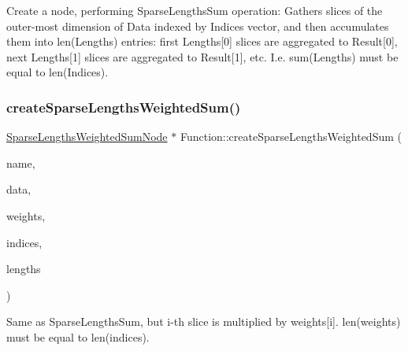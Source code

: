 Create a node, performing Sparse\+Lengths\+Sum operation\+: Gathers slices of the outer-\/most dimension of Data indexed by Indices vector, and then accumulates them into len(\+Lengths) entries\+: first Lengths\mbox{[}0\mbox{]} slices are aggregated to Result\mbox{[}0\mbox{]}, next Lengths\mbox{[}1\mbox{]} slices are aggregated to Result\mbox{[}1\mbox{]}, etc. I.\+e. sum(\+Lengths) must be equal to len(\+Indices). \mbox{\label{classglow_1_1_function_a294f7aafb024ab39071832980f90fa8d}} 
\subsubsection{\texorpdfstring{create\+Sparse\+Lengths\+Weighted\+Sum()}{createSparseLengthsWeightedSum()}\hspace{0.1cm}{\footnotesize\ttfamily [1/2]}}
{\footnotesize\ttfamily \hyperlink{classglow_1_1_sparse_lengths_weighted_sum_node}{Sparse\+Lengths\+Weighted\+Sum\+Node} $\ast$ Function\+::create\+Sparse\+Lengths\+Weighted\+Sum (\begin{DoxyParamCaption}\item[{llvm\+::\+String\+Ref}]{name,  }\item[{\hyperlink{structglow_1_1_node_value}{Node\+Value}}]{data,  }\item[{\hyperlink{structglow_1_1_node_value}{Node\+Value}}]{weights,  }\item[{\hyperlink{structglow_1_1_node_value}{Node\+Value}}]{indices,  }\item[{\hyperlink{structglow_1_1_node_value}{Node\+Value}}]{lengths }\end{DoxyParamCaption})}

Same as Sparse\+Lengths\+Sum, but i-\/th slice is multiplied by weights\mbox{[}i\mbox{]}. len(weights) must be equal to len(indices). \mbox{\label{classglow_1_1_function_a1f195f77eb6fefdaac84ff2e1b887d75}} 

